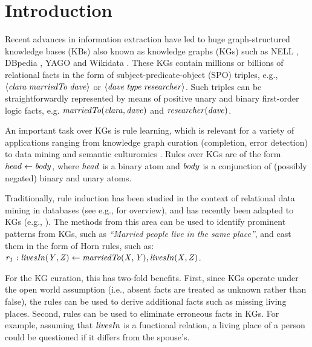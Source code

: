 \section{Introduction}
\label{sec:intro}

Recent advances in information extraction have led to
huge graph-structured knowledge bases (KBs) also known as knowledge graphs (KGs) such as NELL \cite{nell}, DBpedia \cite{dbpedia}, YAGO \cite{yago} and Wikidata \cite{wikidata}. These KGs contain millions or billions of relational facts in the form of subject-predicate-object (SPO) triples, e.g., $\langle\mathit{clara\;marriedTo\;dave}\rangle$ or $\langle\mathit{dave\;type\;researcher}\rangle$. Such triples can be straightforwardly represented by means of positive unary and binary first-order logic facts, e.g. $\mathit{marriedTo(clara,dave)}$ and $\mathit{researcher(dave)}$.

An important task over KGs is rule learning, which is relevant for a variety of applications ranging from knowledge graph curation (completion, error detection) \cite{DBLP:journals/semweb/Paulheim17} to data mining and semantic culturomics \cite{suchanek2014semantic}. Rules over KGs are of the form $\mathit{head \leftarrow body}$, where $\mathit{head}$ is a binary atom and $\mathit{body}$ is a conjunction of (possibly negated) binary and unary atoms. 

Traditionally, rule induction has been studied in the context of relational data mining in databases (see e.g., \cite{DBLP:books/daglib/0021868} for overview), and has recently been adapted to KGs (e.g., \cite{amie,op,rdf2rules}). The methods from this area can be used to identify prominent patterns from KGs, such as \emph{``Married people live in the same
place''}, and cast them in the form of Horn rules, such as:
$\mathit{r_1:\;}\mathit{livesIn(Y,Z)}\leftarrow \mathit{marriedTo(X,Y),livesIn(X,Z)}$. 

For the KG curation, this has two-fold benefits. First, since KGs operate under the open world
assumption (i.e., absent facts are treated as unknown rather than false),
the rules can be used to derive additional facts such as missing living places. %
Second, rules can be used to eliminate erroneous facts in KGs. For example, assuming that $\mathit{livesIn}$ is a functional relation, %
a living place of a person could be questioned if it differs from the spouse's.

